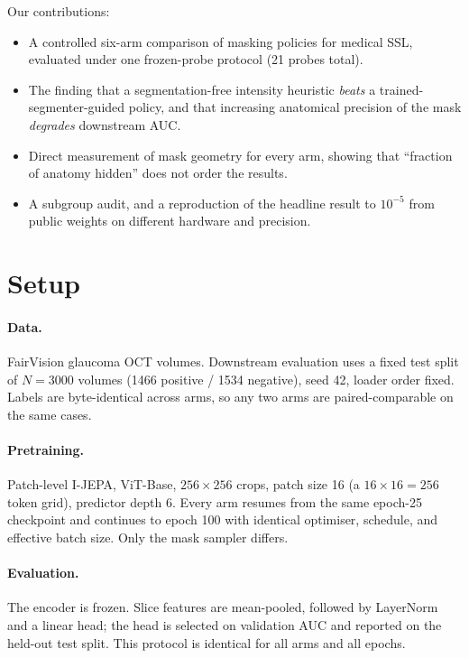 \documentclass{article}
\begin{document}
Our contributions:

\begin{itemize}
\item A controlled six-arm comparison of masking policies for medical SSL,
      evaluated under one frozen-probe protocol (21 probes total).
\item The finding that a segmentation-free intensity heuristic \emph{beats} a
      trained-segmenter-guided policy, and that increasing anatomical precision
      of the mask \emph{degrades} downstream AUC.
\item Direct measurement of mask geometry for every arm, showing that
      ``fraction of anatomy hidden'' does not order the results.
\item A subgroup audit, and a reproduction of the headline result to $10^{-5}$
      from public weights on different hardware and precision.
\end{itemize}

\section{Setup}

\paragraph{Data.} FairVision glaucoma OCT volumes. Downstream evaluation uses a
fixed test split of $N{=}3000$ volumes (1466 positive / 1534 negative), seed 42,
loader order fixed. Labels are byte-identical across arms, so any two arms are
paired-comparable on the same cases.

\paragraph{Pretraining.} Patch-level I-JEPA, ViT-Base, $256{\times}256$ crops,
patch size 16 (a $16{\times}16{=}256$ token grid), predictor depth 6.
Every arm resumes from the same epoch-25 checkpoint and continues to epoch 100
with identical optimiser, schedule, and effective batch size. Only the mask
sampler differs.

\paragraph{Evaluation.} The encoder is frozen. Slice features are mean-pooled,
followed by LayerNorm and a linear head; the head is selected on validation AUC
and reported on the held-out test split. This protocol is identical for all
arms and all epochs.
\end{document}
